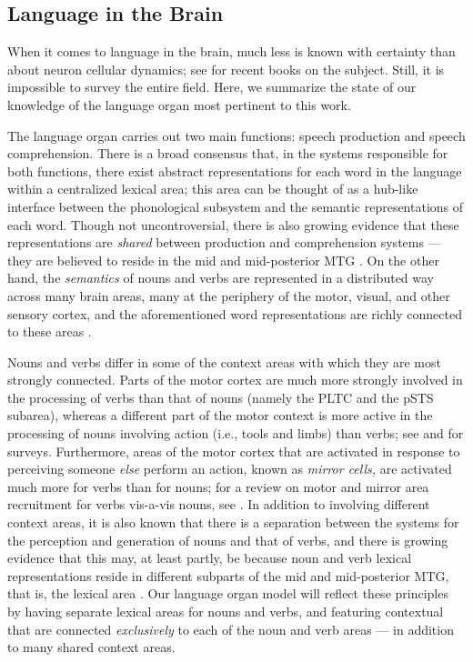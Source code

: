 \documentclass{article}
\begin{document}
\subsection*{Language in the Brain} \label{neurolinguistics}
When it comes to language in the brain, much less is known with certainty than about neuron cellular dynamics; see \citep{kemmerer,friederici,brennan2022language} for recent books on the subject. Still, it is impossible to survey the entire field. Here, we summarize the state of our knowledge of the language organ most pertinent to this work.

The language organ carries out two main functions: speech production and speech comprehension. There is a broad consensus that, in the systems responsible for both functions, there exist abstract representations for each word in the language within a centralized lexical area; this area can be thought of as a hub-like interface between the phonological subsystem and the semantic representations of each word. Though not uncontroversial, there is also growing evidence that these representations are \emph{shared} between production and comprehension systems --- they are believed to reside in the mid and mid-posterior MTG \cite{Indefrey2004}. On the other hand, the \emph{semantics} of nouns and verbs are represented in a distributed way across many brain areas, many at the periphery of the motor, visual, and other sensory cortex, and the aforementioned {word representations} are richly connected to these areas \cite{Martin2007, Kiefer2012, GallantSemantics}. 

Nouns and verbs differ in some of the context areas with which they are most strongly connected. Parts of the motor cortex are much more strongly involved in the processing of verbs than that of nouns (namely the PLTC and the pSTS subarea), whereas a different part of the motor context is more active in the processing of nouns involving action (i.e., tools and limbs) than verbs; see \citet{Gennari2012} and \citet{Watson2013} for surveys. Furthermore, areas of the motor cortex that are activated in response to perceiving someone \emph{else} perform an action, known as \emph{mirror cells,} are activated much more for verbs than for nouns; for a review on motor and mirror area recruitment for verbs vis-a-vis nouns, see \citet{KemmererGonzalez2010, Fernandino2010}. In addition to involving different context areas, it is also known that there is a separation between the systems for the perception and generation of nouns and that of verbs, and there is growing evidence that this may, at least partly, be because noun and verb lexical representations reside in different subparts of the mid and mid-posterior MTG, that is, the lexical area \cite{Matzig2009, Vigliocco2011, Kemmerer2012}. Our language organ model will reflect these principles by having separate lexical areas for nouns and verbs, and featuring contextual that are connected {\em exclusively} to each of the noun and verb areas --- in addition to many shared context areas.
\end{document}
